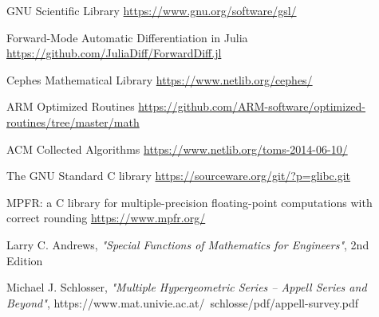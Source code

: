 \documentclass{article}
\theoremstyle{mytheoremstyle}
\theoremstyle{mytheoremstyle}
\theoremstyle{myproblemstyle}
\begin{document}
\begin{thebibliography}{9}
      GNU Scientific Library \url{https://www.gnu.org/software/gsl/}

      Forward-Mode Automatic Differentiation in {J}ulia \url{https://github.com/JuliaDiff/ForwardDiff.jl}

      Cephes Mathematical Library \url{https://www.netlib.org/cephes/}

      ARM Optimized Routines \url{https://github.com/ARM-software/optimized-routines/tree/master/math}


       ACM Collected Algorithms \url{https://www.netlib.org/toms-2014-06-10/}

      The GNU Standard C library \url{https://sourceware.org/git/?p=glibc.git}

      MPFR: a C library for multiple-precision floating-point computations with correct rounding \url{https://www.mpfr.org/}

      Larry C. Andrews, \textit{"Special Functions of Mathematics for Engineers"}, 2nd Edition

      Michael J. Schlosser, \textit{"Multiple Hypergeometric Series – Appell Series
and Beyond"}, https://www.mat.univie.ac.at/~schlosse/pdf/appell-survey.pdf
    \end{thebibliography}
  
\end{document}
